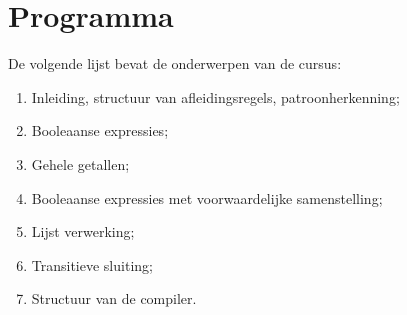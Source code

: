 \section{Programma}
	De volgende lijst bevat de onderwerpen van de cursus:
	\begin{enumerate}
		\item Inleiding, structuur van afleidingsregels, patroonherkenning;
		\item Booleaanse expressies;
		\item Gehele getallen;
		\item Booleaanse expressies met voorwaardelijke samenstelling;
		\item Lijst verwerking;
		\item Transitieve sluiting;
		\item Structuur van de compiler.
	\end{enumerate}
\ \\

